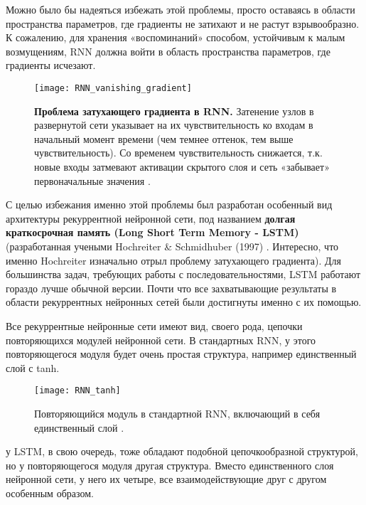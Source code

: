 Можно было бы надеяться избежать этой проблемы, просто оставаясь в области пространства
параметров, где градиенты не затихают и не растут взрывообразно. К сожалению,
для хранения «воспоминаний» способом, устойчивым к малым возмущениям, RNN
должна войти в область пространства параметров, где градиенты исчезают.

\begin{figure}[h!]
    \centering
    \texttt{[image: RNN\_vanishing\_gradient]}
    \caption{\textbf{Проблема затухающего градиента в RNN.} Затенение узлов в 
    развернутой сети указывает на их чувствительность ко входам в начальный момент 
    времени (чем темнее оттенок, тем выше чувствительность). Со временем 
    чувствительность снижается, т.к. новые входы затмевают активации 
    скрытого слоя и сеть «забывает» первоначальные значения \cite{graves}.}
    \label{fig:RNN_vanishing_gradient}
\end{figure}

С целью избежания именно этой проблемы был разработан особенный 
вид архитектуры рекуррентной нейронной сети, под названием 
\textbf{долгая краткосрочная память (Long Short Term Memory - LSTM)} (разработанная учеными 
Hochreiter \& Schmidhuber (1997) \cite{lstm}. Интересно, что именно Hochreiter 
изначально отрыл проблему затухающего градиента). Для большинства задач, требующих 
работы с последовательностями, LSTM работают гораздо лучше обычной версии. 
Почти что все захватывающие результаты в области рекуррентных нейронных 
сетей были достигнуты именно с их помощью. 


Все рекуррентные нейронные сети имеют вид, своего рода, цепочки 
повторяющихся модулей нейронной сети. В стандартных RNN, у этого 
повторяющегося модуля будет очень простая структура, 
например единственный слой с tanh.

\begin{figure}[h!]
    \centering
    \texttt{[image: RNN\_tanh]}
    \caption{Повторяющийся модуль в стандартной RNN, включающий 
    в себя единственный слой \cite{colah2}.}
    \label{fig:RNN_tanh}
\end{figure}

у LSTM, в свою очередь, тоже обладают подобной цепочкообразной структурой, 
но у повторяющегося модуля другая структура. Вместо единственного слоя 
нейронной сети, у него их четыре, все взаимодействующие друг с другом 
особенным образом. 

